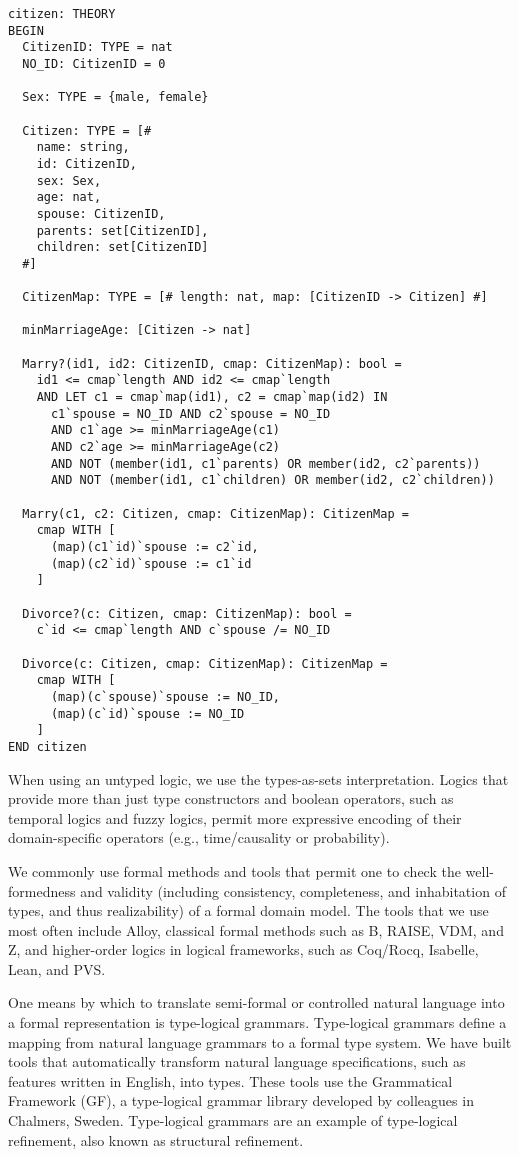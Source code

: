 \documentclass[10pt,letterpaper]{article}
\begin{document}
\begin{lstlisting}
citizen: THEORY
BEGIN
  CitizenID: TYPE = nat
  NO_ID: CitizenID = 0

  Sex: TYPE = {male, female}

  Citizen: TYPE = [#
    name: string,
    id: CitizenID,
    sex: Sex,
    age: nat,
    spouse: CitizenID,
    parents: set[CitizenID],
    children: set[CitizenID]
  #]

  CitizenMap: TYPE = [# length: nat, map: [CitizenID -> Citizen] #]

  minMarriageAge: [Citizen -> nat]

  Marry?(id1, id2: CitizenID, cmap: CitizenMap): bool =
    id1 <= cmap`length AND id2 <= cmap`length
    AND LET c1 = cmap`map(id1), c2 = cmap`map(id2) IN
      c1`spouse = NO_ID AND c2`spouse = NO_ID
      AND c1`age >= minMarriageAge(c1)
      AND c2`age >= minMarriageAge(c2)
      AND NOT (member(id1, c1`parents) OR member(id2, c2`parents))
      AND NOT (member(id1, c1`children) OR member(id2, c2`children))

  Marry(c1, c2: Citizen, cmap: CitizenMap): CitizenMap =
    cmap WITH [
      (map)(c1`id)`spouse := c2`id,
      (map)(c2`id)`spouse := c1`id
    ]

  Divorce?(c: Citizen, cmap: CitizenMap): bool =
    c`id <= cmap`length AND c`spouse /= NO_ID

  Divorce(c: Citizen, cmap: CitizenMap): CitizenMap =
    cmap WITH [
      (map)(c`spouse)`spouse := NO_ID,
      (map)(c`id)`spouse := NO_ID
    ]
END citizen
\end{lstlisting}

When using an untyped logic, we use the types-as-sets interpretation. Logics that provide more than just type constructors and boolean operators, such as temporal logics and fuzzy logics, permit more expressive encoding of their domain-specific operators (e.g., time/causality or probability).

We commonly use formal methods and tools that permit one to check the well-formedness and validity (including consistency, completeness, and inhabitation of types, and thus realizability) of a formal domain model. The tools that we use most often include Alloy, classical formal methods such as B, RAISE, VDM, and Z, and higher-order logics in logical frameworks, such as Coq/Rocq, Isabelle, Lean, and PVS.

One means by which to translate semi-formal or controlled natural language into a formal representation is type-logical grammars. Type-logical grammars define a mapping from natural language grammars to a formal type system. We have built tools that automatically transform natural language specifications, such as features written in English, into types. These tools use the Grammatical Framework (GF), a type-logical grammar library developed by colleagues in Chalmers, Sweden. Type-logical grammars are an example of type-logical refinement, also known as structural refinement.
\end{document}
